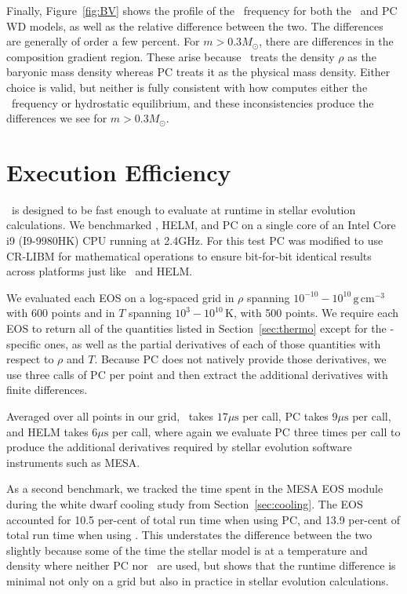 Finally, Figure~\ref{fig:BV} shows the profile of the \brvs\ frequency for both the \skye\ and PC WD models, as well as the relative difference between the two.
The differences are generally of order a few percent.
For $m > 0.3 M_\odot$, there are differences in the composition gradient region.
These arise because \skye\ treats the density $\rho$ as the baryonic mass density whereas PC treats it as the physical mass density.
Either choice is valid, but neither is fully consistent with how  computes either the \brvs\ frequency or hydrostatic equilibrium, and these inconsistencies produce the differences we see for $m > 0.3 M_\odot$.

\section{Execution Efficiency}
\label{sec:speed}

\skye\ is designed to be fast enough to evaluate at runtime in stellar evolution calculations.
We benchmarked \skye, HELM, and PC on a single core of an Intel Core i9 (I9-9980HK) CPU running at 2.4GHz.
For this test PC was modified to use CR-LIBM for mathematical operations to ensure bit-for-bit identical results across platforms just like \skye\ and HELM.

We evaluated each EOS on a log-spaced grid in $\rho$ spanning $10^{-10}-10^{10}\,\mathrm{g\,cm^{-3}}$ with 600 points and in $T$ spanning $10^3-10^{10}\,\mathrm{K}$, with 500 points.
We require each EOS to return all of the quantities listed in Section~\ref{sec:thermo} except for the \skye-specific ones, as well as the partial derivatives of each of those quantities with respect to $\rho$ and $T$.
Because PC does not natively provide those derivatives, we use three calls of PC per point and then extract the additional derivatives with finite differences.

Averaged over all points in our grid, \skye\ takes $17\mu\mathrm{s}$ per call, PC takes $9\mu\mathrm{s}$ per call, and HELM takes $6\mu\mathrm{s}$ per call, where again we evaluate PC three times per call to produce the additional derivatives required by stellar evolution software instruments such as MESA.

As a second benchmark, we tracked the time spent in the MESA EOS module during the white dwarf cooling study from Section~\ref{sec:cooling}.
The EOS accounted for 10.5 per-cent of total run time when using PC, and 13.9 per-cent of total run time when using \skye.
This understates the difference between the two slightly because some of the time the stellar model is at a temperature and density where neither PC nor \skye\ are used, but shows that the runtime difference is minimal not only on a grid but also in practice in stellar evolution calculations.

